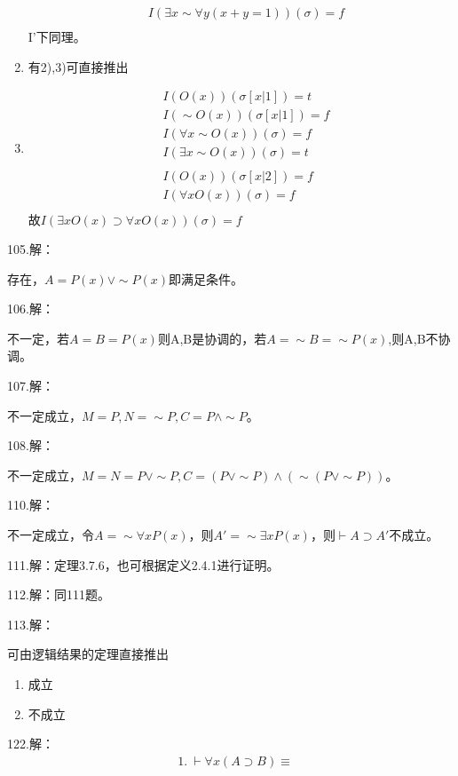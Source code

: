 \documentclass[a4paper]{ctexart}
\begin{document}
\begin{enumerate}
\begin{align*}
    &I(\exists{}{x}\sim\forall{y}(x+y=1))(\sigma)=f\\
  \end{align*}
  I'下同理。
  \item 有2),3)可直接推出
  \item \begin{align*}
    &I(O(x))(\sigma[x|1])=t\\
    &I(\sim O(x))(\sigma[x|1])=f\\
    &I(\forall{x}\sim O(x))(\sigma)=f\\
    &I(\exists{x}\sim O(x))(\sigma)=t\\
    \\
    &I(O(x))(\sigma[x|2])=f\\
    &I(\forall{x} O(x))(\sigma)=f\\
  \end{align*}
  故$I(\exists{x}O(x)\supset\forall{x}O(x))(\sigma)=f$
\end{enumerate}

\noindent 105.解：

存在，$A=P(x)\vee\sim P(x)$即满足条件。\newline

\noindent 106.解：

不一定，若$A=B=P(x)$则{A,B}是协调的，若$A=\sim B=\sim P(x)$,则{A,B}不协调。\newline

\noindent 107.解：

不一定成立，$M=P,N=\sim P,C=P\wedge\sim P$。\newline

\noindent 108.解：

不一定成立，$M=N=P\vee\sim P,C=(P\vee\sim P)\wedge(\sim(P\vee\sim P))$。\newline

\noindent 110.解：

不一定成立，令$A=\sim\forall{x}P(x)$，则$A'=\sim\exists{x}P(x)$，则$\vdash A\supset A'$不成立。\newline

\noindent 111.解：定理3.7.6，也可根据定义2.4.1进行证明。\newline

\noindent 112.解：同111题。\newline

\noindent 113.解：

可由逻辑结果的定理直接推出
\begin{enumerate}
  \item 成立
  \item 不成立
\end{enumerate}

\noindent 122.解：
\begin{align*}
  &1.\ \vdash \forall{x}(A\supset B)\equiv
\end{align*}
\end{document}
